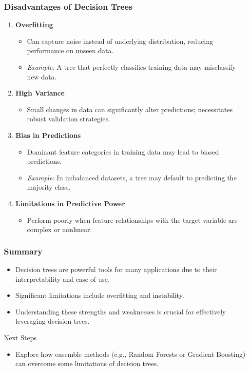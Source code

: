 \documentclass{beamer}
\begin{document}
\begin{frame}[fragile]
    \frametitle{Disadvantages of Decision Trees}
    \begin{enumerate}
        \item \textbf{Overfitting}
        \begin{itemize}
            \item Can capture noise instead of underlying distribution, reducing performance on unseen data.
            \item \textit{Example:} A tree that perfectly classifies training data may misclassify new data.
        \end{itemize}
    
        \item \textbf{High Variance}
        \begin{itemize}
            \item Small changes in data can significantly alter predictions; necessitates robust validation strategies.
        \end{itemize}
    
        \item \textbf{Bias in Predictions}
        \begin{itemize}
            \item Dominant feature categories in training data may lead to biased predictions.
            \item \textit{Example:} In imbalanced datasets, a tree may default to predicting the majority class.
        \end{itemize}
    
        \item \textbf{Limitations in Predictive Power}
        \begin{itemize}
            \item Perform poorly when feature relationships with the target variable are complex or nonlinear.
        \end{itemize}
    \end{enumerate}
\end{frame}

\begin{frame}[fragile]
    \frametitle{Summary}
    \begin{itemize}
        \item Decision trees are powerful tools for many applications due to their interpretability and ease of use.
        \item Significant limitations include overfitting and instability.
        \item Understanding these strengths and weaknesses is crucial for effectively leveraging decision trees.
    \end{itemize}

    \begin{block}{Next Steps}
        \begin{itemize}
            \item Explore how ensemble methods (e.g., Random Forests or Gradient Boosting) can overcome some limitations of decision trees.
        \end{itemize}
    \end{block}
\end{frame}
\end{document}

